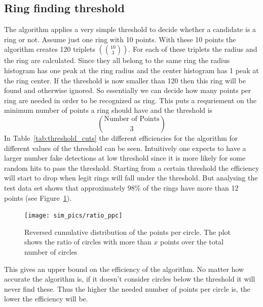 \documentclass[11pt,twoside]{scrreprt}
\begin{document}
\subsection{Ring finding threshold} %
\label{sub:different_thresholds}
The algorithm applies a very simple threshold to decide whether a candidate is a ring or not. Assume just one ring with 10 points. With
these 10 points the algorithm creates 120 triplets $\left(\binom{10}{3}\right)$. For each of these triplets the radius and the ring are calculated.
Since they all belong to the same ring the radius histogram has one peak at the ring radius and the center histogram has 1 peak at
the ring center. If the threshold is now smaller than 120 then this ring will be found and otherwise ignored. So essentially we can 
decide how many points per ring are needed in order to be recognized as ring. This puts a requriement on the minimum number of points
a ring should have and the threshold is
\[
  \binom{\text{Number of Points}}{3}
\]
In Table~\ref{tab:threshold_cuts} the different efficiencies for the algorithm for different values of the threshold can be seen. 
Intuitively one expects to have a larger number fake detections at low threshold since it is more likely for some random hits to pass 
the threshold. Starting from a certain threshold the efficiency will start to drop when legit rings will fall under the threshold. But
analysing the test data set shows that approximately $98\%$ of the rings have more than 12 points (see Figure~\ref{fig:ratio_ppc}).

\begin{figure}[tb]
  \centering
  \texttt{[image: sim\_pics/ratio\_ppc]}
  \caption{Reversed cumulative distribution of the points per circle. The plot shows the ratio of circles with more than $x$ points over the
  total number of circles}
  \label{fig:ratio_ppc}
\end{figure}

This gives an upper bound on the efficiency of the algorithm. No matter 
how accurate the algorithm is, if it doesn't consider circles below the threshold it will never find these. Thus the higher 
the needed number of points per circle is, the lower the efficiency will be. 
\end{document}
